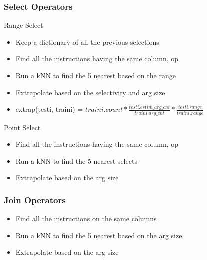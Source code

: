 \begin{frame}
\frametitle{Select Operators}
\begin{block}{Range Select}
\begin{itemize}
\item Keep a dictionary of all the previous selections
\item Find all the instructions having the same column, op
\item Run a kNN to find the 5 nearest based on the range
\item Extrapolate based on the selectivity and arg size
\item extrap(testi, traini) = $traini.count * \frac{testi.estim\_arg\_cnt}{traini.arg\_cnt} *  \frac{testi.range}{traini.range}$
\end{itemize}
\end{block}
\begin{block}{Point Select}
\begin{itemize}
\item Find all the instructions having the same column, op
\item Run a kNN to find the 5 nearest selects
\item Extrapolate based on the arg size
\end{itemize}
\end{block}
\end{frame}

\begin{frame}
\frametitle{Join Operators}
\begin{itemize}
\item Find all the instructions on the same columns
\item Run a kNN to find the 5 nearest based on the arg size
\item Extrapolate based on the arg size
\end{itemize}
\end{frame}
